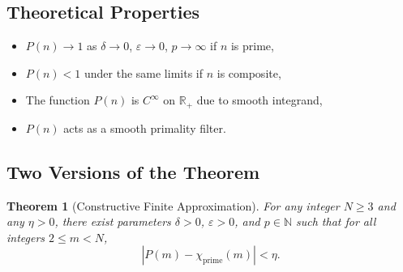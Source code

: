 \documentclass[12pt]{article}
\theoremstyle{definition}
\theoremstyle{plain}
\newtheorem{theorem}[definition]{Theorem}
\theoremstyle{remark}
\begin{document}
\subsection{Theoretical Properties}

\begin{itemize}
  \item \( P(n) \to 1 \) as \( \delta \to 0 \), \( \varepsilon \to 0 \), \( p \to \infty \) if \( n \) is prime,
  \item \( P(n) < 1 \) under the same limits if \( n \) is composite,
  \item The function \( P(n) \) is \( C^\infty \) on \( \mathbb{R}_+ \) due to smooth integrand,
  \item \( P(n) \) acts as a smooth primality filter.
\end{itemize}

\subsection{Two Versions of the Theorem}

\begin{theorem}[Constructive Finite Approximation]
\label{thm:constructive}
For any integer \( N \geq 3 \) and any \( \eta > 0 \), there exist parameters \( \delta > 0 \), \( \varepsilon > 0 \), and \( p \in \mathbb{N} \) such that for all integers \( 2 \leq m < N \),
\[
|P(m) - \chi_{\mathrm{prime}}(m)| < \eta.
\]
\end{theorem}
\end{document}

